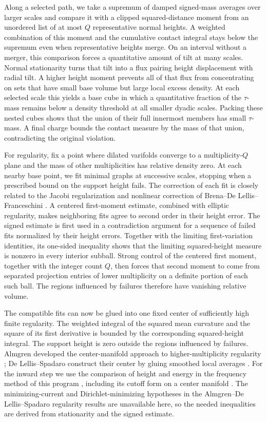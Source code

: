 Along a selected path, we take a supremum of damped signed-mass averages
over larger scales and compare it with a clipped squared-distance moment
from an unordered list of at most $Q$ representative normal heights.
A weighted combination of this moment and the cumulative contact integral
stays below the supremum even when representative heights merge. On an
interval without a merger, this comparison forces a quantitative amount
of tilt at many scales. Normal stationarity turns that tilt into a flux
pairing height displacement with radial tilt. A higher height moment
prevents all of that flux from concentrating on sets that have small base
volume but large local excess density. At each selected scale this yields
a base cube in which a quantitative fraction of the $\tau$-mass remains
below a density threshold at all smaller dyadic scales. Packing these
nested cubes shows that the union of their full innermost members has small
$\tau$-mass. A final charge bounds the contact measure by the mass of that
union, contradicting the original violation.

For regularity, fix a point where dilated varifolds converge to a
multiplicity-$Q$ plane
and the mass of other multiplicities has relative density zero. At each
nearby base point, we fit minimal graphs at successive scales, stopping
when a prescribed bound on the support height fails. The correction of
each fit is closely related
to the Jacobi regularization and nonlinear correction of
Brena--De Lellis--Franceschini \cite[Sections~2 and~6]{BDLF2025}.
A centered first-moment estimate, combined with elliptic regularity,
makes neighboring fits agree to second order in their height error.
The signed estimate is first used in a contradiction argument for a
sequence of failed fits normalized by their height errors. Together with
the limiting first-variation identities, its one-sided
inequality shows that the limiting squared-height measure is nonzero in
every interior subball. Strong control of the centered first moment,
together with the integer count $Q$, then forces that second moment to
come from separated projection entries of lower multiplicity on a definite
portion of each such ball. The regions
influenced by failures therefore have vanishing relative volume.

The compatible fits can now be glued into one fixed center of sufficiently
high finite regularity. The weighted integral of the squared mean curvature
and the square of its first derivative is bounded by the corresponding
squared-height integral. The support height is zero outside the regions
influenced by failures. Almgren developed the center-manifold approach
to higher-multiplicity regularity \cite{Almgren2000};
De Lellis--Spadaro construct their center by gluing smoothed local averages
\cite{DLS2016II}. For the inward step we use the comparison of height and
energy in the frequency method of this program
\cite[Section~3.4]{DLS2011}, including its cutoff form on a center manifold
\cite[Section~3]{DLS2016III}. The minimizing-current and
Dirichlet-minimizing hypotheses in the Almgren--De Lellis--Spadaro
regularity results are unavailable here, so the needed inequalities
are derived from stationarity and the signed estimate.

